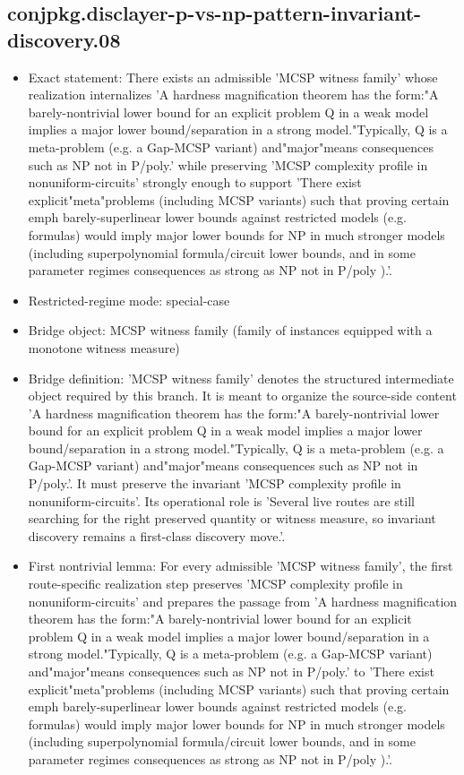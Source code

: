 \documentclass[11pt]{article}
\begin{document}
\subsection*{conjpkg.disclayer-p-vs-np-pattern-invariant-discovery.08}
\begin{itemize}
\item Exact statement: There exists an admissible 'MCSP witness family' whose realization internalizes 'A hardness magnification theorem has the form:"A barely-nontrivial lower bound for an explicit problem Q in a weak model implies a major lower bound/separation in a strong model."Typically, Q is a meta-problem (e.g. a Gap-MCSP variant) and"major"means consequences such as NP not in P/poly.' while preserving 'MCSP complexity profile in nonuniform-circuits' strongly enough to support 'There exist explicit"meta"problems (including MCSP variants) such that proving certain emph barely-superlinear lower bounds against restricted models (e.g. formulas) would imply major lower bounds for NP in much stronger models (including superpolynomial formula/circuit lower bounds, and in some parameter regimes consequences as strong as NP not in P/poly ).'.
\item Restricted-regime mode: special-case
\item Bridge object: MCSP witness family (family of instances equipped with a monotone witness measure)
\item Bridge definition: 'MCSP witness family' denotes the structured intermediate object required by this branch. It is meant to organize the source-side content 'A hardness magnification theorem has the form:"A barely-nontrivial lower bound for an explicit problem Q in a weak model implies a major lower bound/separation in a strong model."Typically, Q is a meta-problem (e.g. a Gap-MCSP variant) and"major"means consequences such as NP not in P/poly.'. It must preserve the invariant 'MCSP complexity profile in nonuniform-circuits'. Its operational role is 'Several live routes are still searching for the right preserved quantity or witness measure, so invariant discovery remains a first-class discovery move.'.
\item First nontrivial lemma: For every admissible 'MCSP witness family', the first route-specific realization step preserves 'MCSP complexity profile in nonuniform-circuits' and prepares the passage from 'A hardness magnification theorem has the form:"A barely-nontrivial lower bound for an explicit problem Q in a weak model implies a major lower bound/separation in a strong model."Typically, Q is a meta-problem (e.g. a Gap-MCSP variant) and"major"means consequences such as NP not in P/poly.' to 'There exist explicit"meta"problems (including MCSP variants) such that proving certain emph barely-superlinear lower bounds against restricted models (e.g. formulas) would imply major lower bounds for NP in much stronger models (including superpolynomial formula/circuit lower bounds, and in some parameter regimes consequences as strong as NP not in P/poly ).'.

\end{itemize}
\end{document}
